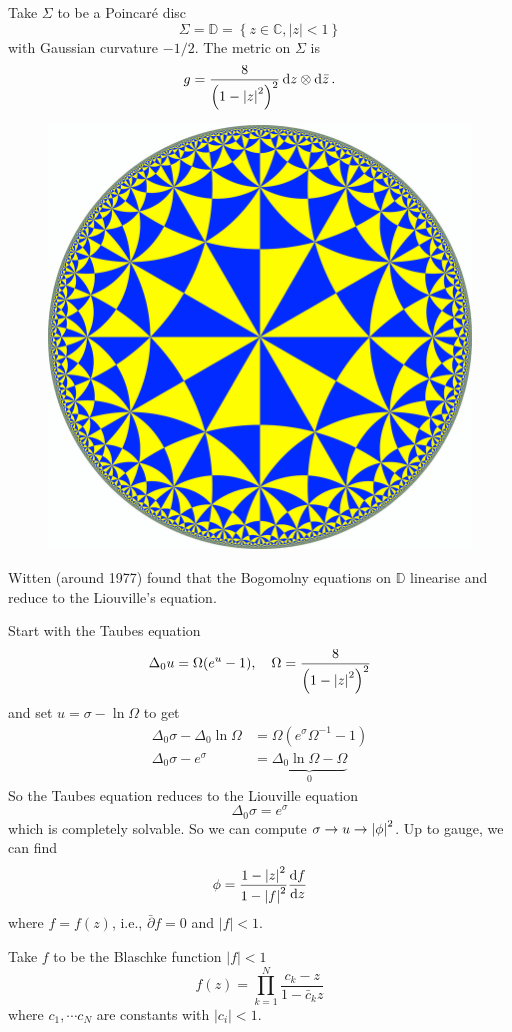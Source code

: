 \documentclass[a4paper,11pt]{article}
\begin{document}
    \begin{ex}
        Take $\Sigma$ to be a Poincar\'e disc 
        \begin{equation}
            \Sigma = \mathbb{D} = \left\{ z\in \mathbb{C}, |z| < 1 \right\}
        \end{equation}
        with Gaussian curvature $-1/2$. The metric on $\Sigma$ is 
        \begin{equation}
            g = \frac{8}{\left( 1 - \abs{z}^2 \right)^2} \dd{z} \otimes \dd{\bar z}.
        \end{equation}
        \begin{figure}[H]
            \centering
            \includegraphics[width=0.25\linewidth]{fig/poincare.png}
        \end{figure}
        Witten (around 1977) found that the Bogomolny equations on $\mathbb{D}$ linearise and reduce to the Liouville's equation.

        Start with the Taubes equation 
        \begin{equation}
            \Delta_0 u = \Omega (e^u-1), \quad \Omega = \frac{8}{\left( 1 - \abs{z}^2 \right)^2}
        \end{equation}
        and set $u = \sigma - \ln \Omega$ to get 
        \begin{equation}
            \begin{split}
                \Delta_0 \sigma - \Delta_0 \ln \Omega & = \Omega \left( e^\sigma \Omega^{-1} - 1 \right)\\
                \Delta_0 \sigma - e^{\sigma} & = \underbrace{\Delta_0 \ln \Omega - \Omega}_{0}
            \end{split}
        \end{equation}
        So the Taubes equation reduces to the Liouville equation
        \begin{equation}
            \boxed{\Delta_0 \sigma = e^\sigma}
        \end{equation}
        which is completely solvable. So we can compute $\sigma \to u \to \abs{\phi}^2$. Up to gauge, we can find 
        \begin{equation}
            \phi = \frac{1 - \abs{z}^2}{1 - \abs{f}^2} \dv{f}{z}
        \end{equation}
        where $f = f(z)$, i.e., $\bar \partial f = 0$ and $|f| < 1$.

        Take $f$ to be the Blaschke function $|f| < 1$ 
        \begin{equation}
            f(z) = \prod_{k=1}^{N} \frac{c_k - z}{1 - \bar c_k z}
        \end{equation}
        where $c_1, \cdots c_N$ are constants with $|c_i| < 1$.
    \end{ex}
\end{document}
